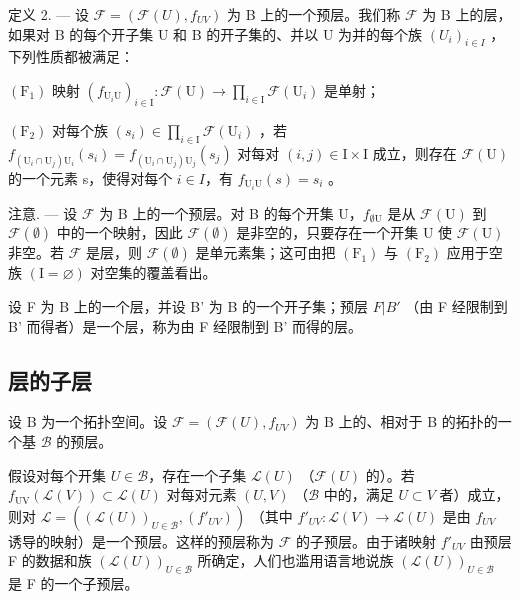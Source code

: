定义 2. --- 设 \(\mathcal{F} = (\mathcal{F}(U), f_{UV})\) 为 B 上的一个预层。我们称 \(\mathcal{F}\) 为 B 上的层，如果对 B 的每个开子集 U 和 B 的开子集的、并以 U 为并的每个族 \((U_i)_{i \in I}\) ，下列性质都被满足：

\((\mathrm{F}_{1})\) 映射 \((f_{\mathrm{U}_{i}\mathrm{U}})_{i\in\mathrm{I}}\colon\mathcal{F}(\mathrm{U})\to\prod_{i\in\mathrm{I}}\mathcal{F}(\mathrm{U}_{i})\) 是单射；

\((\mathrm{F}_{2})\) 对每个族 \((s_{i}) \in \prod_{i \in \mathrm{I}} \mathcal{F}(\mathrm{U}_{i})\) ，若 \(f_{(\mathrm{U}_{i} \cap \mathrm{U}_{j})\mathrm{U}_{i}}(s_{i}) = f_{(\mathrm{U}_{i} \cap \mathrm{U}_{j})\mathrm{U}_{j}}(s_{j})\) 对每对 \((i, j) \in \mathrm{I} \times \mathrm{I}\) 成立，则存在 \(\mathcal{F}(\mathrm{U})\) 的一个元素 s，使得对每个 \(i \in I\)，有 \(f_{\mathrm{U}_{i}\mathrm{U}}(s) = s_{i}\) 。

注意. --- 设 \(\mathcal{F}\) 为 B 上的一个预层。对 B 的每个开集 U，\(f_{\emptyset \mathrm{U}}\) 是从 \(\mathcal{F}(\mathrm{U})\) 到 \(\mathcal{F}(\emptyset)\) 中的一个映射，因此 \(\mathcal{F}(\emptyset)\) 是非空的，只要存在一个开集 U 使 \(\mathcal{F}(\mathrm{U})\) 非空。若 \(\mathcal{F}\) 是层，则 \(\mathcal{F}(\emptyset)\) 是单元素集；这可由把 \((\mathrm{F}_{1})\) 与 \((\mathrm{F}_{2})\) 应用于空族 \((\mathrm{I}=\varnothing)\) 对空集的覆盖看出。

设 F 为 B 上的一个层，并设 B' 为 B 的一个开子集；预层 \(F|B'\) （由 F 经限制到 B' 而得者）是一个层，称为由 F 经限制到 B' 而得的层。

\subsection{层的子层}

设 B 为一个拓扑空间。设 \(\mathcal{F} = (\mathcal{F}(U), f_{UV})\) 为 B 上的、相对于 B 的拓扑的一个基 \(\mathcal{B}\) 的预层。

假设对每个开集 \(U \in \mathcal{B}\)，存在一个子集 \(\mathcal{L}(U)\) （\(\mathcal{F}(U)\) 的）。若 \(f_{\mathrm{UV}}(\mathcal{L}(V)) \subset \mathcal{L}(U)\) 对每对元素 \((U, V)\) （\(\mathcal{B}\) 中的，满足 \(U \subset V\) 者）成立，则对 \(\mathcal{L} = ((\mathcal{L}(U))_{U \in \mathcal{B}}, (f'_{UV}))\) （其中 \(f'_{UV} \colon \mathcal{L}(V) \to \mathcal{L}(U)\) 是由 \(f_{UV}\) 诱导的映射）是一个预层。这样的预层称为 \(\mathcal{F}\) 的子预层。由于诸映射 \(f'_{UV}\) 由预层 F 的数据和族 \((\mathcal{L}(U))_{U \in \mathcal{B}}\) 所确定，人们也滥用语言地说族 \((\mathcal{L}(U))_{U \in \mathcal{B}}\) 是 F 的一个子预层。

